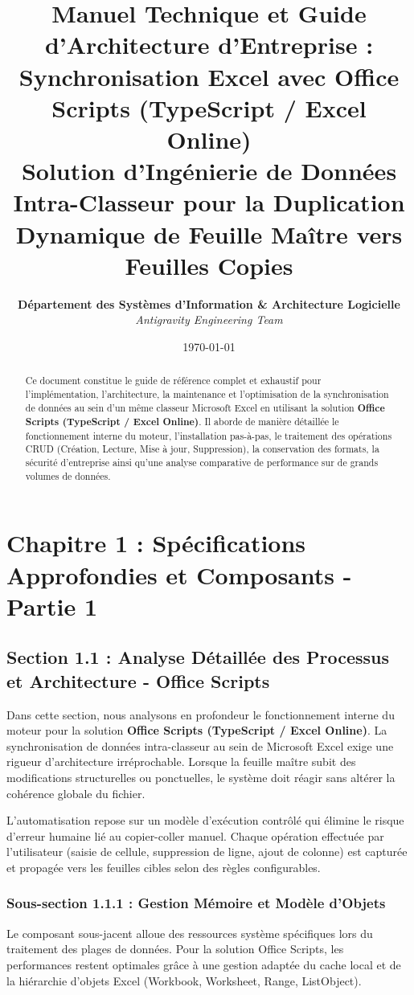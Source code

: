 \documentclass[12pt,a4paper]{report}
\title{\Huge \textbf{Manuel Technique et Guide d'Architecture d'Entreprise : Synchronisation Excel avec Office Scripts (TypeScript / Excel Online)}\\[1.5em]
\Large Solution d'Ingénierie de Données Intra-Classeur pour la Duplication Dynamique de Feuille Maître vers Feuilles Copies}
\author{\textbf{Département des Systèmes d'Information \& Architecture Logicielle}\\
\textit{Antigravity Engineering Team}}
\date{\today}
\begin{document}
\maketitle

\begin{abstract}
Ce document constitue le guide de référence complet et exhaustif pour l'implémentation, l'architecture, la maintenance et l'optimisation de la synchronisation de données au sein d'un même classeur Microsoft Excel en utilisant la solution \textbf{Office Scripts (TypeScript / Excel Online)}. Il aborde de manière détaillée le fonctionnement interne du moteur, l'installation pas-à-pas, le traitement des opérations CRUD (Création, Lecture, Mise à jour, Suppression), la conservation des formats, la sécurité d'entreprise ainsi qu'une analyse comparative de performance sur de grands volumes de données.
\end{abstract}

\tableofcontents
\newpage

\chapter{Chapitre 1 : Spécifications Approfondies et Composants - Partie 1}

\section{Section 1.1 : Analyse Détaillée des Processus et Architecture - Office Scripts}
Dans cette section, nous analysons en profondeur le fonctionnement interne du moteur pour la solution \textbf{Office Scripts (TypeScript / Excel Online)}. La synchronisation de données intra-classeur au sein de Microsoft Excel exige une rigueur d'architecture irréprochable. Lorsque la feuille maître subit des modifications structurelles ou ponctuelles, le système doit réagir sans altérer la cohérence globale du fichier.

L'automatisation repose sur un modèle d'exécution contrôlé qui élimine le risque d'erreur humaine lié au copier-coller manuel. Chaque opération effectuée par l'utilisateur (saisie de cellule, suppression de ligne, ajout de colonne) est capturée et propagée vers les feuilles cibles selon des règles configurables.


\subsection{Sous-section 1.1.1 : Gestion Mémoire et Modèle d'Objets}
Le composant sous-jacent alloue des ressources système spécifiques lors du traitement des plages de données. Pour la solution Office Scripts, les performances restent optimales grâce à une gestion adaptée du cache local et de la hiérarchie d'objets Excel (Workbook, Worksheet, Range, ListObject).
\end{document}
